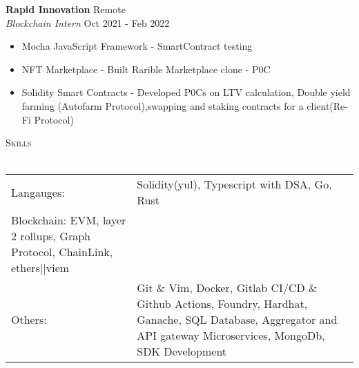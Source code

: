 \documentclass[a4paper]{article}
\newcommand{\lineunder} {
    \vspace*{-8pt} \\
    \hspace*{-18pt} \hrulefill \\
}
\newcommand{\header} [1] {
    {\hspace*{-18pt}\vspace*{6pt} \textsc{#1}}
    \vspace*{-6pt} \lineunder
}
\begin{document}
\textbf{Rapid Innovation} \hfill Remote\\
\textit{Blockchain Intern} \hfill Oct 2021 - Feb 2022\\
\vspace{-1mm}
\begin{itemize} \itemsep 1pt
	\item Mocha JavaScript Framework - SmartContract testing
	\item NFT Marketplace - Built Rarible Marketplace clone - P0C
    \item Solidity Smart Contracts - Developed P0Cs on LTV calculation, Double yield farming (Autofarm Protocol),swapping and staking contracts for a client(Re-Fi Protocol)
\end{itemize}

\header{Skills}
\begin{tabularx}{\textwidth}{ l X } 
	Langauges:  & Solidity(yul), Typescript with DSA, Go, Rust\\
    Blockchain: EVM, layer 2 rollups, Graph Protocol, ChainLink, ethers||viem\\
	Others:     & Git \& Vim, Docker, Gitlab CI/CD \& Github Actions, Foundry, Hardhat, Ganache, SQL Database, Aggregator and API gateway Microservices, MongoDb, SDK Development \\
\end{tabularx}
\vspace{2mm}
\end{document}
